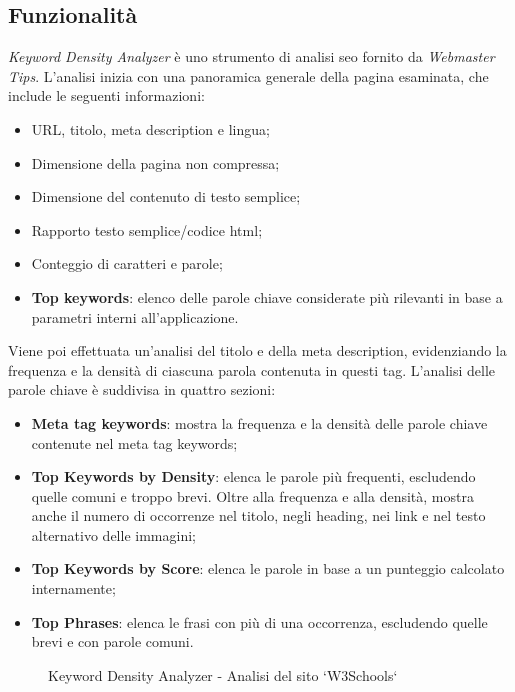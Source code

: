 \subsection{Funzionalità}
\par \textit{Keyword Density Analyzer} è uno strumento di analisi \gls{seo} fornito da \textit{Webmaster Tips}. L'analisi inizia con una panoramica generale della pagina esaminata, che include le seguenti informazioni:
\begin{itemize}
    \item URL, titolo, meta description e lingua;
    \item Dimensione della pagina non compressa;
    \item Dimensione del contenuto di testo semplice;
    \item Rapporto testo semplice/codice \gls{html};
    \item Conteggio di caratteri e parole;
    \item \textbf{Top keywords}: elenco delle parole chiave considerate più rilevanti in base a parametri interni all'applicazione.
\end{itemize}
Viene poi effettuata un'analisi del titolo e della meta description, evidenziando la frequenza e la densità di ciascuna parola contenuta in questi tag. L'analisi delle parole chiave è suddivisa in quattro sezioni:
\begin{itemize}
    \item \textbf{Meta tag keywords}: mostra la frequenza e la densità delle parole chiave contenute nel meta tag keywords;
    \item \textbf{Top Keywords by Density}: elenca le parole più frequenti, escludendo quelle comuni e troppo brevi. Oltre alla frequenza e alla densità, mostra anche il numero di occorrenze nel titolo, negli heading, nei link e nel testo alternativo delle immagini;
    \item \textbf{Top Keywords by Score}: elenca le parole in base a un punteggio calcolato internamente;
    \item \textbf{Top Phrases}: elenca le frasi con più di una occorrenza, escludendo quelle brevi e con parole comuni.
\end{itemize}

\begin{figure}[H]
    \centering 
    \caption{Keyword Density Analyzer - Analisi del sito `W3Schools`}
\end{figure}

